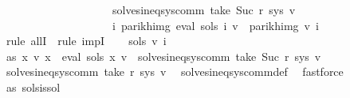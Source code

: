 \begin{isabellebody}
\ \ \ \ \ \ \ \ \ \ \ \ \ \ \ \ \ \ \ {\isasymand}\ solves{\isacharunderscore}{\kern0pt}ineq{\isacharunderscore}{\kern0pt}sys{\isacharunderscore}{\kern0pt}comm\ {\isacharparenleft}{\kern0pt}take\ {\isacharparenleft}{\kern0pt}Suc\ r{\isacharparenright}{\kern0pt}\ sys{\isacharparenright}{\kern0pt}\ v{}\isanewline
\ \ \ \ \ \ \ \ \ \ \ \ \ \ \ \ \ \ \ {\isasymlongrightarrow}\ {\isacharparenleft}{\kern0pt}{\isasymforall}i{\isachardot}{\kern0pt}\ parikh{\isacharunderscore}{\kern0pt}img\ {\isacharparenleft}{\kern0pt}eval\ {\isacharparenleft}{\kern0pt}sols{\isacharprime}{\kern0pt}\ i{\isacharparenright}{\kern0pt}\ v{}{\isacharparenright}{\kern0pt}\ {\isasymsubseteq}\ parikh{\isacharunderscore}{\kern0pt}img\ {\isacharparenleft}{\kern0pt}v{}\ i{\isacharparenright}{\kern0pt}{\isacharparenright}{\kern0pt}{\isachardoublequoteclose}\isanewline
%
\isadelimproof
%
\endisadelimproof
%
\isatagproof
{}\isamarkupfalse%
\ {\isacharparenleft}{\kern0pt}rule\ allI\ {\isacharbar}{\kern0pt}\ rule\ impI{\isacharparenright}{\kern0pt}{\isacharplus}{\kern0pt}\isanewline
\ \ \isamarkupfalse%
\ sols{}\ v{}\ i\isanewline
\ \ \isamarkupfalse%
\ as{\isacharcolon}{\kern0pt}\ {\isachardoublequoteopen}{\isacharparenleft}{\kern0pt}{\isasymforall}x{\isachardot}{\kern0pt}\ v{}\ x\ {\isacharequal}{\kern0pt}\ eval\ {\isacharparenleft}{\kern0pt}sols{}\ x{\isacharparenright}{\kern0pt}\ v{}{\isacharparenright}{\kern0pt}\ {\isasymand}\ solves{\isacharunderscore}{\kern0pt}ineq{\isacharunderscore}{\kern0pt}sys{\isacharunderscore}{\kern0pt}comm\ {\isacharparenleft}{\kern0pt}take\ {\isacharparenleft}{\kern0pt}Suc\ r{\isacharparenright}{\kern0pt}\ sys{\isacharparenright}{\kern0pt}\ v{}{\isachardoublequoteclose}\isanewline
\isanewline
\ \ \isamarkupfalse%
\ \isamarkupfalse%
\ {\isachardoublequoteopen}solves{\isacharunderscore}{\kern0pt}ineq{\isacharunderscore}{\kern0pt}sys{\isacharunderscore}{\kern0pt}comm\ {\isacharparenleft}{\kern0pt}take\ r\ sys{\isacharparenright}{\kern0pt}\ v{}{\isachardoublequoteclose}\ \isamarkupfalse%
\ solves{\isacharunderscore}{\kern0pt}ineq{\isacharunderscore}{\kern0pt}sys{\isacharunderscore}{\kern0pt}comm{\isacharunderscore}{\kern0pt}def\ \isamarkupfalse%
\ fastforce\isanewline
\ \ \isamarkupfalse%
\ as\ sols{\isacharunderscore}{\kern0pt}is{\isacharunderscore}{\kern0pt}sol\ \isamarkupfalse%

\end{isabellebody}
